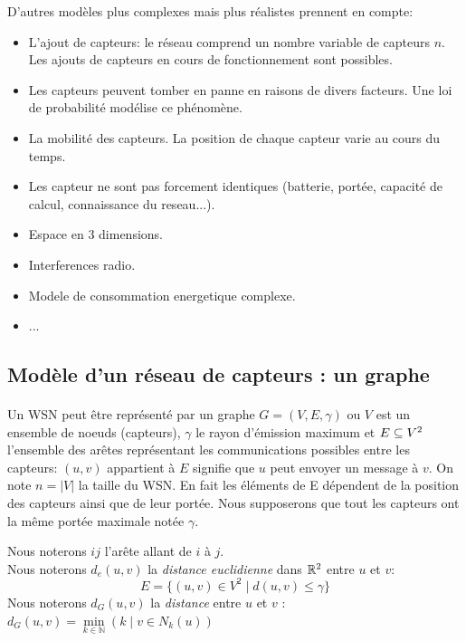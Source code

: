 D'autres modèles plus complexes mais plus réalistes prennent en compte:
  
\begin{itemize}
   
 \item L'ajout de capteurs: le réseau comprend un nombre variable de capteurs $n$. Les ajouts de capteurs en cours de fonctionnement sont possibles.
 \item Les capteurs peuvent tomber en panne en raisons de divers facteurs. Une loi de probabilité modélise ce phénomène.   
 \item La mobilité des capteurs. La position de chaque capteur varie au cours du temps.
 \item Les capteur ne sont pas forcement identiques (batterie, portée, capacité de calcul, connaissance du reseau...).
 \item Espace en 3 dimensions.
 \item Interferences radio.
 \item Modele de consommation energetique complexe.
 \item ...
\end{itemize}


\subsection{Modèle d'un réseau de capteurs : un graphe}

 \paragraph*{} Un WSN peut être représenté par un graphe $G= (V,E,\gamma)$ ou $V$ est un ensemble de noeuds (capteurs), $\gamma$ le rayon d'émission maximum et $E \subseteq V \textsuperscript{2}$ l'ensemble des arêtes représentant les communications possibles entre les capteurs: $(u,v)$ appartient à $E$ signifie que $u$ peut envoyer un  message à $v$. On note $ n=|V| $ la taille du WSN. En fait les éléments de E dépendent de la
 position des capteurs ainsi que de leur portée. Nous supposerons que tout les capteurs ont la même portée maximale notée $\gamma$. 


\begin{mydef}
Nous noterons $ij$ l'arête allant de $i$ à $j$. \\
Nous noterons $d_e(u,v)$ la \textit{distance euclidienne} dans $\mathbb{R} \textsuperscript{2}$ entre $u$ et $v$:
$$E = \{ (u,v) \in V ^{2} \mid d(u,v) \leq \gamma \}$$
Nous noterons $d_G(u,v)$ la \textit{distance} entre $ u $ et $ v $ : $d_G(u,v)= \min\limits_{k \in \mathbb{N}}(k \mid v \in N_k(u))$
\end{mydef}


